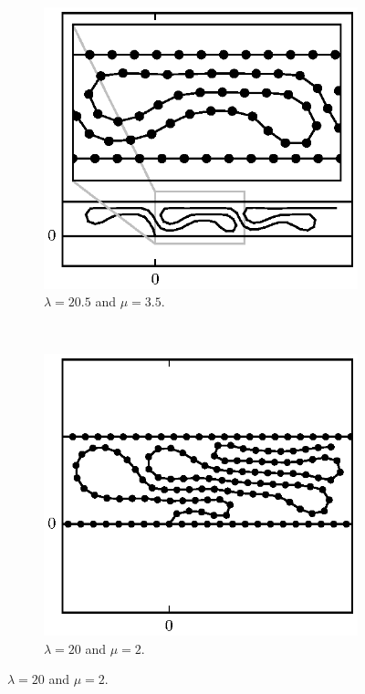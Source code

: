{	\begin{figure}
		\centering
		\begin{subfigure}{.5\textwidth}
			\centering
			\includegraphics{./fig/ch3/push/eb0.1/l20.5_m3.5.eps}
			\caption{$\lambda=20.5$ and $\mu=3.5$.\label{subfig:multi_bridge}}
		\end{subfigure}%
		~
		\begin{subfigure}{.5\textwidth}
			\centering
			\includegraphics{./fig/ch3/push/eb0.1_et0.1/l20_m2.eps}
			\caption{$\lambda=20$ and $\mu=2$.\label{subfig:slant_crushed}}
		\end{subfigure}


\end{figure}}
